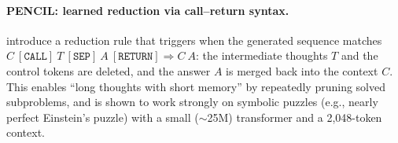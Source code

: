 \documentclass{article}
\newcommand{\zain}[1]{{\color{blue}[ZS: #1]}}
\begin{document}



\paragraph{PENCIL: learned reduction via call--return syntax.}
\citet{yang2025pencil} introduce a reduction rule that triggers when the generated sequence matches
\(C~[\texttt{CALL}]~T~[\texttt{SEP}]~A~[\texttt{RETURN}] \Rightarrow C~A\): the intermediate thoughts \(T\) and the control tokens are deleted, and the answer \(A\) is merged back into the context \(C\).
This enables ``long thoughts with short memory'' by repeatedly pruning solved subproblems, and is shown to work strongly on symbolic puzzles (e.g., nearly perfect Einstein’s puzzle) with a small ($\sim$25M) transformer and a 2{,}048-token context.
\end{document}
